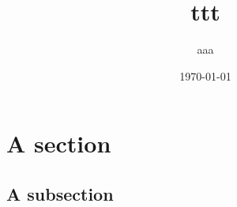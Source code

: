\documentclass{beamer}
\author[aaa]{aaa}
\institute[iii]{iii}
\title[ttt]{ttt}
\date{\today}
\begin{document}
\section{A section}
\subsection{A subsection}
\end{document}
